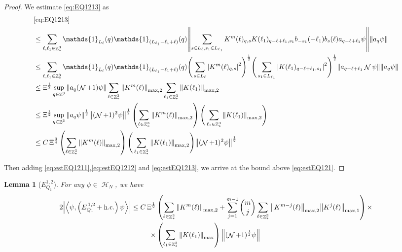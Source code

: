 \documentclass[sn-mathphys, Numbered ,a4paper]{sn-jnl}%
\DeclareMathOperator{\Z}{\mathbb{Z}}
\DeclareMathOperator{\HH}{\mathcal{H}}
\DeclareMathOperator{\NN}{\mathcal{N}}
\newcommand{\half}{\frac{1}{2}}
\newcommand{\eva}[1]{\left\langle #1 \right\rangle}
\theoremstyle{plain}
\newtheorem{lemma}[theorem]{Lemma}
\theoremstyle{definition}
\theoremstyle{remark}
\theoremstyle{plain}
\theoremstyle{definition}
\theoremstyle{remark}
\begin{document}
\begin{proof}
We estimate \eqref{eq:EQ1213} as
\begin{align}
	&\eqref{eq:EQ1213}\nonumber\\
	&\leq\sum\limits_{\ell, \ell_1\in \Z^3_*} \mathds{1}_{L_{\ell}}(q)  \mathds{1}_{(L_{\ell_1}-\ell_1+\ell)}(q)  \norm{ \sum\limits_{s\in L_{\ell}, s_1 \in L_{\ell_1}} K^m(\ell)_{q,s}K(\ell_1)_{q-\ell+\ell_1,s_1} b_{-s_1}(-\ell_1) b_{s}(\ell) a_{q-\ell+\ell_1}\psi}\norm{ a_{q}\psi }\nonumber\\
	&\leq\sum\limits_{\ell, \ell_1\in \Z^3_*}  \mathds{1}_{L_{\ell}}(q) \mathds{1}_{(L_{\ell_1}-\ell_1+\ell)}(q) \Bigg(\sum\limits_{s \in L_{\ell}} \abs{K^m(\ell)_{q,s}}^2\Bigg)^\half \Bigg(\sum\limits_{s_1 \in L_{\ell_1}} \abs{K(\ell_1)_{q-\ell+\ell_1,s_1}}^2\Bigg)^\half \norm{ a_{q-\ell+\ell_1} \NN\psi} \norm{ a_{q}\psi }\nonumber\\
	&\leq \Xi^\half \sup_{q \in \Z^3}\norm{ a_{q} (\NN+1)\psi}\sum\limits_{\ell \in \Z^3_*} \norm{  K^{m}(\ell)}_{\mathrm{max,2}}  \sum\limits_{\ell_1 \in \Z^3_*} \norm{K(\ell_1)}_{\mathrm{max,2}} \nonumber\\
	&\leq  \Xi^\half  \sup_{q \in \Z^3}\norm{ a_{q} \psi}^\half \norm{ (\NN+1)^2\psi}^\half \left(\sum\limits_{\ell \in \Z^3_*} \norm{K^m(\ell)}_{\mathrm{max,2}}\right)\Bigg(\sum\limits_{\ell_1 \in \Z^3_*} \norm{K(\ell_1)}_{\mathrm{max,2}}\Bigg) \nonumber\\
	&\leq C\, \Xi^{\frac{3}{4}} \left(\sum\limits_{\ell \in \Z^3_*} \norm{K^m(\ell)}_{\mathrm{max,2}}\right)\Bigg(\sum\limits_{\ell_1 \in \Z^3_*} \norm{K(\ell_1)}_{\mathrm{max,2}} \Bigg)  \norm{ (\NN+1)^2\psi}^\half \label{eq:estEQ1213}
\end{align}

Then adding \eqref{eq:estEQ1211},\eqref{eq:estEQ1212} and \eqref{eq:estEQ1213}, we arrive at the bound above \eqref{eq:estEQ121}.
\end{proof}
\begin{lemma}[$E_{Q_1}^{1,2}$]
For any $\psi \in \HH_N$, we have
\begin{align}
	2\abs{\eva{\psi,\left(E^{\,1,2}_{Q_1}+\mathrm{h.c.}\right) \psi }}\nonumber
	\leq C\, \Xi^{\half} &\left(\sum\limits_{\ell\in \Z^3_*} \norm{K^m(\ell)}_{\mathrm{max,2}} + \sum\limits_{j=1}^{m-1} {{m}\choose j} \sum\limits_{\ell \in \Z^3_*} \norm{K^{m-j}(\ell)}_{\mathrm{max,2}} \norm{ K^{j}(\ell)}_{\mathrm{max,1}}\right)\times\nonumber \\ \quad \times &\left(\sum\limits_{\ell_1\in \Z^3_*} \norm{K(\ell_1)}_{\mathrm{max}} \right) \norm{(\NN+1)^\half
		 \psi } \label{eq:estEQ112}
\end{align}
\end{lemma}
\end{document}
